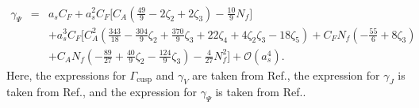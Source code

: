 \documentclass[aps,prl,twocolumn,secnumarabic,notitlepage,superscriptaddress,nofootinbib,tightenlines,floatfix,preprintnumbers]{revtex4-1}
\newcommand{\nn}{\nonumber}
\renewcommand{\(}{\left(}
\renewcommand{\)}{\right)}
\renewcommand{\[}{\left[}
\renewcommand{\]}{\right]}
\begin{document}
\begin{widetext}
\begin{eqnarray}
\end{eqnarray}
\begin{eqnarray}
\label{a4}
\gamma_\Psi&=&a_sC_F +a_s^2 C_F\Big[C_A\(\frac{49}{9}-2\zeta_2+2\zeta_3\)-\frac{10}{9}N_f\Big]
\\\nn &&
+a_s^3C_F\Big[C_A^2 \left(\frac{343}{18}-\frac{304 }{9}\zeta_2+\frac{370 }{9}\zeta_3+22 \zeta_4+4 \zeta_2\zeta_3-18 \zeta_5\right)+C_F N_f \left(-\frac{55}{6}+8 \zeta_3\right)
\\\nn &&
+C_A N_f \left( -\frac{89}{27}+\frac{40}{9} \zeta_2 -\frac{124}{9} \zeta_3\right) -\frac{4}{27} N_f^2\Big]+\mathcal{O}(a_s^4).
\end{eqnarray}
Here, the expressions for $\Gamma_{\text{cusp}}$ and $\gamma_V$ are taken from Ref.\cite{Echevarria:2015uaa}, the expression for $\gamma_J$ is taken from Ref.\cite{Chetyrkin:2003vi}, and the expression for $\gamma_{\Psi}$ is taken from Ref.\cite{Bruser:2019yjk}. 


\end{widetext}
\end{document}
